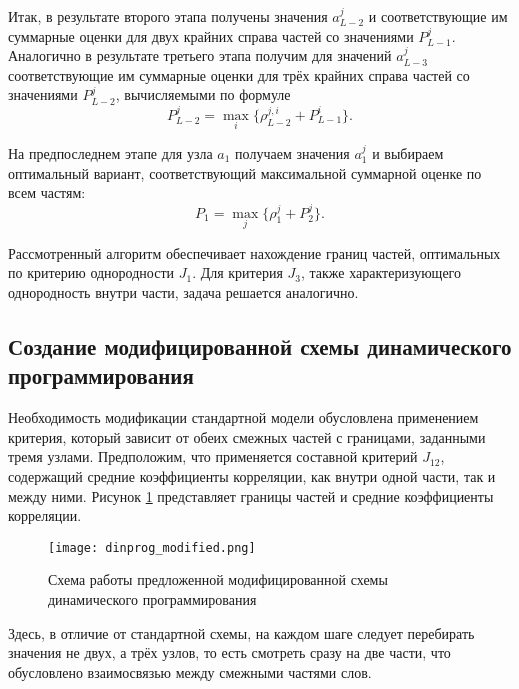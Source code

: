 Итак, в результате второго этапа получены значения $a_{L-2}^j$ и соответствующие им суммарные оценки для двух крайних справа частей со значениями $P_{L-1}^j$.
Аналогично в результате третьего этапа получим для значений $a_{L-3}^j$ соответствующие им суммарные оценки для трёх крайних справа частей со значениями $P_{L-2}^j$, вычисляемыми по формуле
\begin{equation}
P_{L-2}^j = \max_{i} \{\rho_{L-2}^{j, i} + P_{L-1}^i \}.
\end{equation}

На предпоследнем этапе для узла $a_1$ получаем значения $a_1^j$ и выбираем оптимальный вариант, соответствующий максимальной суммарной оценке по всем частям:
\begin{equation}
P_1 = \max_{j} \{\rho_1^j + P_2^j \}.
\end{equation}

Рассмотренный алгоритм обеспечивает нахождение границ частей, оптимальных по критерию однородности $J_1$.
Для критерия $J_3$, также характеризующего однородность внутри части, задача решается аналогично. 


\subsection{Создание модифицированной схемы динамического программирования} \label{sect2_2_5}

Необходимость модификации стандартной модели обусловлена применением критерия, который зависит от обеих смежных частей с границами, заданными тремя узлами.
Предположим, что применяется составной критерий $J_{12}$, содержащий средние коэффициенты корреляции, как внутри одной части, так и между ними.
Рисунок \ref{fig:dinprog_modified} представляет границы частей и средние коэффициенты корреляции.

\begin{figure}[h]
	\centering
	\texttt{[image: dinprog\_modified.png]}
	\caption{Схема работы предложенной модифицированной схемы динамического программирования}
	\label{fig:dinprog_modified}
\end{figure}

Здесь, в отличие от стандартной схемы, на каждом шаге следует перебирать значения не двух, а трёх узлов, то есть смотреть сразу на две части, что обусловлено взаимосвязью между смежными частями слов.

